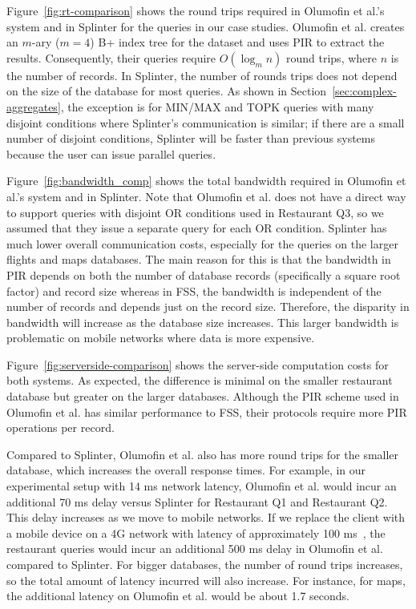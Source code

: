 Figure~\ref{fig:rt-comparison} shows 
the round trips required in Olumofin et al.'s system and in Splinter
for the queries in our case studies. Olumofin et al. creates
an $m$-ary ($m=4$) B+ index tree for the dataset and
uses PIR to extract the results. Consequently, their queries
require $O(\log_m n)$ round trips, where $n$ is
the number of records. In Splinter, the number of rounds trips
does not depend on the size of the database for most queries.
As shown in Section~\ref{sec:complex-aggregates}, 
the exception is for MIN/MAX and TOPK queries with many disjoint
conditions where Splinter's
communication is similar; if there are a small number of disjoint
conditions, Splinter will be faster than previous systems 
because the user can issue parallel queries.

Figure~\ref{fig:bandwidth_comp} shows the total bandwidth
required in Olumofin et al.'s system and in Splinter. Note that
Olumofin et al. does not have a direct way to support queries with
disjoint OR conditions used in Restaurant Q3, so we assumed that they issue a separate query
for each OR condition. Splinter has much lower overall communication
costs, especially for the queries on the larger flights and maps
databases. The main reason for this is that the bandwidth
in PIR depends on both the number of database records (specifically a square root factor) 
and record size whereas in FSS, the bandwidth is
independent of the number of records and depends just on the record size. 
Therefore, the disparity in bandwidth
will increase as the database size increases. This larger bandwidth
is problematic on mobile networks where data is more expensive.

Figure~\ref{fig:serverside-comparison} shows the server-side computation
costs for both systems. As expected, the difference is minimal 
on the smaller restaurant database but greater on the larger databases. 
Although the PIR scheme used in Olumofin et al. has similar performance to
FSS, their protocols require more PIR operations per record.

Compared to Splinter, Olumofin et al. also has more round trips
for the smaller database, which increases the overall response times. For example,
in our experimental setup with 14 ms network latency, Olumofin et al. would 
incur an additional 70 ms delay versus Splinter for Restaurant Q1 and Restaurant Q2. 
This delay increases as we move to mobile networks. If we replace
the client with a mobile device on a 4G network with 
latency of approximately 100 ms~\cite{mobile-delays}, 
the restaurant queries would incur an additional 500 ms delay in Olumofin et al.
compared to Splinter. For bigger databases, the number of round trips increases,
so the total amount of latency incurred will also increase. For instance,
for maps, the additional latency on Olumofin et al. would be about 1.7 seconds.

